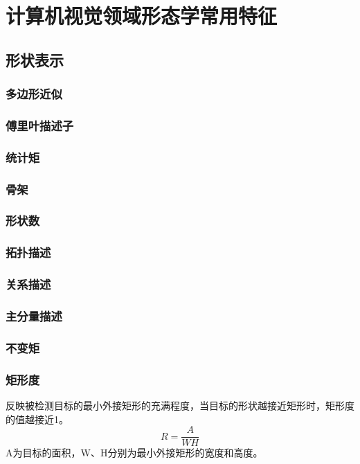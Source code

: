 \section{计算机视觉领域形态学常用特征}

\subsection{形状表示}

\subsubsection{多边形近似}

\subsubsection{傅里叶描述子}

\subsubsection{统计矩}

\subsubsection{骨架}

\subsubsection{形状数}

\subsubsection{拓扑描述}

\subsubsection{关系描述}

\subsubsection{主分量描述}

\subsubsection{不变矩}

\subsubsection{矩形度}
反映被检测目标的最小外接矩形的充满程度，当目标的形状越接近矩形时，矩形度的值越接近1。
    \begin{displaymath}
    R=\frac{A}{WH}
    \end{displaymath}
    A为目标的面积，W、H分别为最小外接矩形的宽度和高度。

